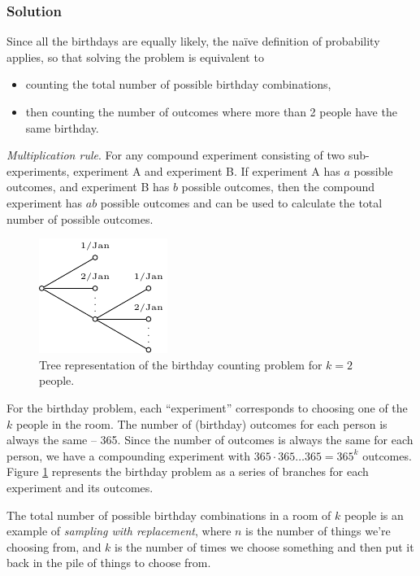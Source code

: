 \clearpage
\subsubsection{Solution}

Since all the birthdays are equally likely, 
the naïve definition of probability applies, 
so that solving the problem is equivalent to
\begin{itemize}
\item
counting the total number of possible birthday combinations,
\item
then counting the number of outcomes where more than 2 people have the same birthday.
\end{itemize}

\emph{Multiplication rule}. 
For any compound experiment consisting of two sub-experiments, 
experiment A and experiment B. 
If experiment A has \(a\) possible outcomes, 
and experiment B has \(b\) possible outcomes,
then the compound experiment has \(ab\) possible outcomes and 
can be used to calculate the total number of possible outcomes.

\begin{figure}[h!]
\centering
\includegraphics[width=0.25\linewidth]{tikz/figure1}
\caption{Tree representation of the birthday counting problem for \(k=2\) people.}
\label{fig:tree}
\end{figure}

For the birthday problem, 
each ``experiment'' corresponds to choosing one of the \(k\) people in the room. 
The number of (birthday) outcomes for each person is always the same -- 365. 
Since the number of outcomes is always the same for each person, 
we have a compounding experiment with \(365 \cdot 365 \ldots 365 = 365^k\) outcomes.
Figure \ref{fig:tree} represents the birthday problem as a series of 
branches for each experiment and its outcomes.

The total number of possible birthday combinations in a room of \(k\) people is an example 
of \emph{sampling with replacement}, 
where \(n\) is the number of things we're choosing from, 
and \(k\) is the number of times we choose something and then put it 
back in the pile of things to choose from.

